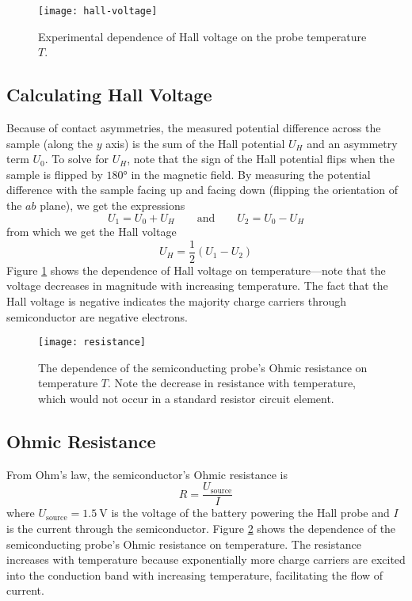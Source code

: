 \documentclass[11pt, a4paper]{article}
\newcommand{\eqtext}[1]{\qquad \text{#1} \qquad}
\begin{document}
\begin{figure}
\centering
\texttt{[image: hall-voltage]}
\caption{Experimental dependence of Hall voltage on the probe temperature $ T $.}
\label{hall:fig:hall-voltage}
\end{figure}
\subsection{Calculating Hall Voltage}
Because of contact asymmetries, the measured potential difference across the sample (along the $ y $ axis) is the sum of the Hall potential $ U_{H} $ and an asymmetry term $ U_{0} $. To solve for $ U_{H} $, note that the sign of the Hall potential flips when the sample is flipped by $ \ang{180} $ in the magnetic field. By measuring the potential difference with the sample facing up and facing down (flipping the orientation of the $ ab $ plane), we get the expressions
\begin{equation*}
	U_{1} = U_{0} + U_{H}  \eqtext{and} U_{2} = U_{0} - U_{H} 
\end{equation*}
from which we get the Hall voltage
\begin{equation*}
	U_{H} = \frac{1}{2}(U_{1} - U_{2})
\end{equation*}
Figure \ref{hall:fig:hall-voltage} shows the dependence of Hall voltage on temperature---note that the voltage decreases in magnitude with increasing temperature. The fact that the Hall voltage is negative indicates the majority charge carriers through semiconductor are negative electrons.


\begin{figure}
\centering
\texttt{[image: resistance]}
\caption{The dependence of the semiconducting probe's Ohmic resistance on temperature $ T $. Note the decrease in resistance with temperature, which would not occur in a standard resistor circuit element.}
\label{hall:fig:resistance}
\end{figure}

\subsection{Ohmic Resistance}
From Ohm's law, the semiconductor's Ohmic resistance is
\begin{equation*}
	 R = \frac{U_{\text{source}}}{I} 
\end{equation*}
where $ U_{\text{source}} = \SI{1.5}{\volt} $ is the voltage of the battery powering the Hall probe and $ I $ is the current through the semiconductor. Figure \ref{hall:fig:resistance} shows the dependence of the semiconducting probe's Ohmic resistance on temperature. The resistance increases with temperature because exponentially more charge carriers are excited into the conduction band with increasing temperature, facilitating the flow of current.
\end{document}
